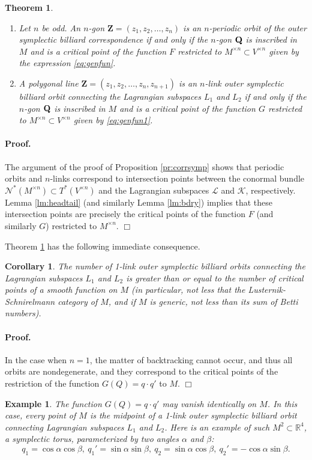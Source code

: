 \documentclass[12pt]{article}
\newtheorem{example}[lemma]{Example}
\newtheorem{theorem}{Theorem}
\newtheorem{corollary}[lemma]{Corollary}
\newcommand{\proofend}{$\Box$\bigskip}
\newcommand{\R}{{\mathbb R}}
\def\proof{\paragraph{Proof.}}
\begin{document}
\begin{theorem} \label{thm:crit}$ $
\begin{enumerate}  %
\item Let $n$ be odd. An $n$-gon $\mathbf{Z}=(z_1,z_2,\ldots,z_n)$ is an $n$-periodic orbit of the outer symplectic billiard correspondence if and only if the $n$-gon ${\bf Q}$ is inscribed in $M$ and is a critical point of the function $F$ restricted to $M^{\times n}\subset V^{\times n}$ given by the expression \eqref{eq:genfun}.  
\item A polygonal line $\mathbf{Z}=(z_1,z_2,\ldots,z_n,z_{n+1})$ is an $n$-link outer symplectic billiard orbit connecting the Lagrangian subspaces $L_1$ and $L_2$ if and only if the $n$-gon ${\bf Q}$ is inscribed in $M$ and is a critical point of the function $G$ restricted to $M^{\times n}\subset V^{\times n}$ given by \eqref{eq:genfun1}.
\end{enumerate}
\end{theorem}

\proof
The argument of the proof of Proposition \ref{pr:corrsymp} shows that periodic orbits and $n$-links correspond to intersection points between the conormal bundle ${\mathcal N}^* (M^{\times n})  \subset T^* (V^{\times n})$ and the Lagrangian subspaces $\mathscr{L}$ and $\mathscr{K}$, respectively. Lemma \ref{lm:headtail} (and similarly Lemma \ref{lm:bdry}) implies that these intersection points are precisely the critical points of the function $F$ (and similarly $G$) restricted to $M^{\times n}$. 
\proofend

Theorem \ref{thm:crit} has the following immediate consequence.

\begin{corollary} \label{cor:oneshot}
The number of 1-link outer symplectic billiard orbits connecting the Lagrangian subspaces $L_1$ and $L_2$ is greater than or equal to the number of critical points of a smooth function on $M$ (in particular, not less that the Lusternik-Schnirelmann category of $M$, and if $M$ is generic, not less than its sum of Betti numbers).
\end{corollary} 

\proof
In the case when $n=1$, the matter of backtracking cannot occur, and thus all orbits are nondegenerate, and they correspond to the critical points of the restriction of the function $G(Q)= q \cdot q'$ to $M$. 
\proofend

\begin{example} \label{ex:all}
{\rm 
The function $G(Q)=q \cdot q'$ may vanish identically on $M$. In this case, every point of $M$ is the midpoint of a 1-link outer symplectic billiard orbit connecting Lagrangian subspaces $L_1$ and $L_2$. Here is an example of such $M^2 \subset \R^4$, a symplectic torus, parameterized by two angles $\alpha$ and $\beta$:
$$
q_1=\cos\alpha\cos\beta,\ q_1'=\sin\alpha\sin\beta,\ q_2=\sin\alpha\cos\beta,\ q_2'=-\cos\alpha\sin\beta.
$$
}
\end{example}
\end{document}
